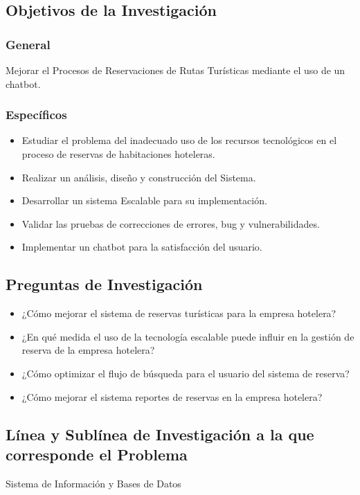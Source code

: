 \documentclass[12pt,a4paper,oneside]{article}
\begin{document}
\subsection{Objetivos de la Investigación}
\subsubsection{General}
    Mejorar el Procesos de Reservaciones de Rutas Turísticas mediante el uso de un chatbot.
\subsubsection{Específicos}
    \begin{itemize}
      \item {Estudiar el problema del inadecuado uso de los recursos tecnológicos en el proceso de reservas de habitaciones hoteleras.}
      \item {Realizar un análisis, diseño y construcción del Sistema.}
      \item {Desarrollar un sistema Escalable para su implementación.}
      \item {Validar las pruebas de correcciones de errores, bug y vulnerabilidades.}
      \item {Implementar un chatbot para la satisfacción del usuario.}
    \end{itemize}
\subsection{Preguntas de Investigación}
    \begin{itemize}
        \item {¿Cómo mejorar el sistema de reservas turísticas para la empresa hotelera?}
        \item {¿En qué medida el uso de la tecnología escalable puede influir en la gestión de reserva de la empresa hotelera?}
        \item {¿Cómo optimizar el flujo de búsqueda para el usuario del sistema de reserva?}
        \item {¿Cómo mejorar el sistema reportes de reservas en la empresa hotelera?}
    \end{itemize}
\subsection{Línea y Sublínea de Investigación a la que corresponde el Problema}
    Sistema de Información y Bases de Datos 
    
\end{document}
